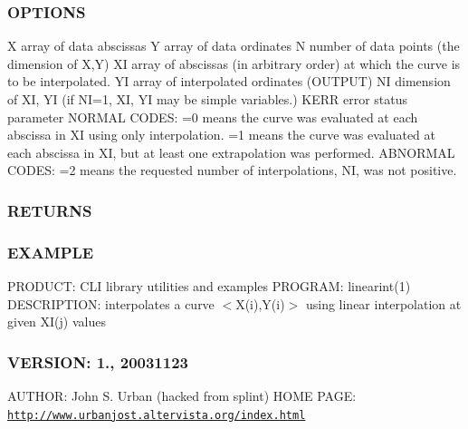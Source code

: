 \subsubsection*{O\+P\+T\+I\+O\+NS}

X array of data abscissas Y array of data ordinates N number of data points (the dimension of X,Y) XI array of abscissas (in arbitrary order) at which the curve is to be interpolated. YI array of interpolated ordinates (O\+U\+T\+P\+UT) NI dimension of XI, YI (if NI=1, XI, YI may be simple variables.) K\+E\+RR error status parameter N\+O\+R\+M\+AL C\+O\+D\+ES\+: =0 means the curve was evaluated at each abscissa in XI using only interpolation. =1 means the curve was evaluated at each abscissa in XI, but at least one extrapolation was performed. A\+B\+N\+O\+R\+M\+AL C\+O\+D\+ES\+: =2 means the requested number of interpolations, NI, was not positive. \subsubsection*{R\+E\+T\+U\+R\+NS}

\subsubsection*{E\+X\+A\+M\+P\+LE}

P\+R\+O\+D\+U\+CT\+: C\+LI library utilities and examples P\+R\+O\+G\+R\+AM\+: linearint(1) D\+E\+S\+C\+R\+I\+P\+T\+I\+ON\+: interpolates a curve $<$X(i),Y(i)$>$ using linear interpolation at given X\+I(j) values \subsubsection*{V\+E\+R\+S\+I\+ON\+: 1., 20031123}

A\+U\+T\+H\+OR\+: John S. Urban (hacked from splint) H\+O\+ME P\+A\+GE\+: \href{http://www.urbanjost.altervista.org/index.html}{\tt http\+://www.\+urbanjost.\+altervista.\+org/index.\+html} \mbox{\label{namespacem__math_ac5b38d6e45c30842b20c944bf2e88629}} 
